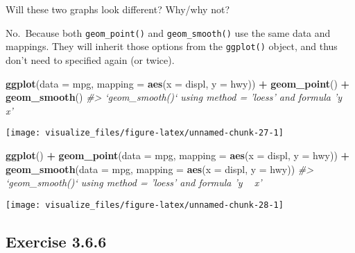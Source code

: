 \documentclass[]{book}
\newenvironment{Shaded}{\begin{snugshade}}{\end{snugshade}}
\newcommand{\CommentTok}[1]{\textcolor[rgb]{0.56,0.35,0.01}{\textit{#1}}}
\newcommand{\DataTypeTok}[1]{\textcolor[rgb]{0.13,0.29,0.53}{#1}}
\newcommand{\KeywordTok}[1]{\textcolor[rgb]{0.13,0.29,0.53}{\textbf{#1}}}
\newcommand{\NormalTok}[1]{#1}
\newcommand{\OperatorTok}[1]{\textcolor[rgb]{0.81,0.36,0.00}{\textbf{#1}}}
\newcommand{\StringTok}[1]{\textcolor[rgb]{0.31,0.60,0.02}{#1}}
\theoremstyle{plain}
\theoremstyle{remark}
\begin{document}
Will these two graphs look different? Why/why not?

No.~Because both \texttt{geom\_point()} and \texttt{geom\_smooth()} use
the same data and mappings. They will inherit those options from the
\texttt{ggplot()} object, and thus don't need to specified again (or
twice).

\begin{Shaded}
\begin{Highlighting}[]
\KeywordTok{ggplot}\NormalTok{(}\DataTypeTok{data =}\NormalTok{ mpg, }\DataTypeTok{mapping =} \KeywordTok{aes}\NormalTok{(}\DataTypeTok{x =}\NormalTok{ displ, }\DataTypeTok{y =}\NormalTok{ hwy)) }\OperatorTok{+}
\StringTok{  }\KeywordTok{geom_point}\NormalTok{() }\OperatorTok{+}
\StringTok{  }\KeywordTok{geom_smooth}\NormalTok{()}
\CommentTok{#> `geom_smooth()` using method = 'loess' and formula 'y ~ x'}
\end{Highlighting}
\end{Shaded}

\begin{center}\texttt{[image: visualize\_files/figure-latex/unnamed-chunk-27-1]} \end{center}

\begin{Shaded}
\begin{Highlighting}[]
\KeywordTok{ggplot}\NormalTok{() }\OperatorTok{+}
\StringTok{  }\KeywordTok{geom_point}\NormalTok{(}\DataTypeTok{data =}\NormalTok{ mpg, }\DataTypeTok{mapping =} \KeywordTok{aes}\NormalTok{(}\DataTypeTok{x =}\NormalTok{ displ, }\DataTypeTok{y =}\NormalTok{ hwy)) }\OperatorTok{+}
\StringTok{  }\KeywordTok{geom_smooth}\NormalTok{(}\DataTypeTok{data =}\NormalTok{ mpg, }\DataTypeTok{mapping =} \KeywordTok{aes}\NormalTok{(}\DataTypeTok{x =}\NormalTok{ displ, }\DataTypeTok{y =}\NormalTok{ hwy))}
\CommentTok{#> `geom_smooth()` using method = 'loess' and formula 'y ~ x'}
\end{Highlighting}
\end{Shaded}

\begin{center}\texttt{[image: visualize\_files/figure-latex/unnamed-chunk-28-1]} \end{center}

\hypertarget{exercise-3.6.6}{%
\subsection*{\texorpdfstring{Exercise
{3.6.6}}{Exercise 3.6.6}}\label{exercise-3.6.6}}
\end{document}
